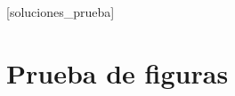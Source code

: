 \documentclass[11pt, a4paper]{LegrandOrangeBookES}
\begin{document}
    [soluciones_prueba]
    \chapter{Prueba de figuras}
    
\end{document}
